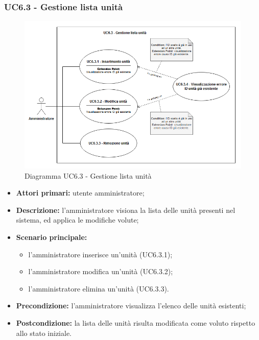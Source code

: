 \subsubsection{UC6.3 - Gestione lista unità}
	\begin{figure}[h!]
		\centering
		\includegraphics[width=16cm]{images/UC6.3.png}
		\caption{Diagramma UC6.3 - Gestione lista unità}
	\end{figure}
	\begin{itemize}
		\item \textbf{Attori primari:} utente amministratore;
		\item \textbf{Descrizione:} l'amministratore visiona la lista delle unità presenti nel sistema, ed applica le modifiche volute;
		\item \textbf{Scenario principale:} 
			\begin{itemize}
				\item l'amministratore inserisce un'unità (UC6.3.1);
				\item l'amministratore modifica un'unità (UC6.3.2);
				\item l'amministratore elimina un'unità (UC6.3.3).
			\end{itemize}
		\item \textbf{Precondizione:} l'amministratore visualizza l'elenco delle unità esistenti;
		\item \textbf{Postcondizione:} la lista delle unità risulta modificata come voluto rispetto allo stato iniziale.
	\end{itemize}

